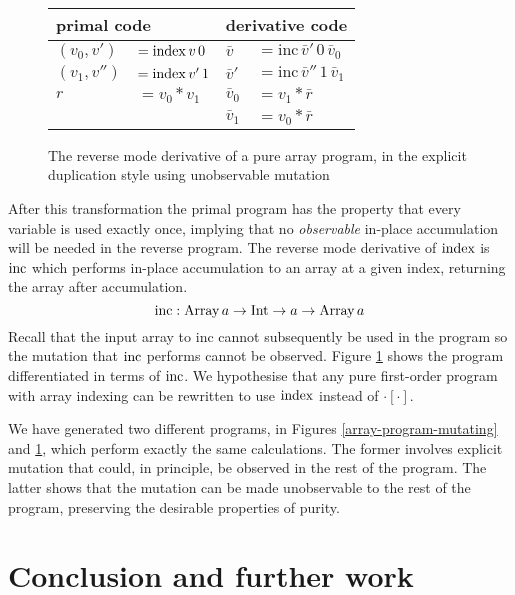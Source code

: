 \documentclass[12pt]{article}
\begin{document}
\begin{figure}[t]
\center
\begin{tabular}[t]{ll|ll}
  \multicolumn{2}{l|}{primal code}
  &
  \multicolumn{2}{l}{derivative code}
  \\

  \hline

  $(v_0, v')$ & $ = \mathrm{index} \, v \, 0$
  &
  $\bar{v}$ & $ = \mathrm{inc} \, \bar{v}' \, 0 \, \bar{v}_0$
  \\
  
  $(v_1, v'')$ & $ = \mathrm{index} \, v' \, 1$
  &
  $\bar{v}'$ & $ = \mathrm{inc} \, \bar{v}'' \, 1 \, \bar{v}_1$
  \\

  $r$ & $ = v_0 * v_1$
  &
  $\bar{v}_0$ & $ = v_1 * \bar{r}$
  \\

  & &
  $\bar{v}_1$ & $ = v_0 * \bar{r}$
  \\
\end{tabular}
\caption{\label{array-program-dup} The reverse mode derivative of
  a pure array program, in the explicit duplication style using
  unobservable mutation}
\end{figure}

After this transformation the primal program has the property that
every variable is used exactly once, implying that no
\emph{observable} in-place accumulation will be needed in the reverse
program.  The reverse mode derivative of $\mathrm{index}$ is $\mathrm{inc}$ which
performs in-place accumulation to an array at a given index, returning the array
after accumulation.
\[
\mathrm{inc} : \mathrm{Array} \, a \to \mathrm{Int} \to a \to \mathrm{Array}
\, a
\]
Recall that the input array to $\textrm{inc}$
cannot subsequently be used in the program so the mutation that
$\mathrm{inc}$ performs cannot be observed.  Figure \ref{array-program-dup}
shows the program differentiated in terms of $\mathrm{inc}$.
We hypothesise that any pure first-order program with array indexing
can be rewritten to use $\mathrm{index}$ instead of $\cdot[\cdot]$.

We have generated two different programs, in Figures
\ref{array-program-mutating} and \ref{array-program-dup}, which
perform exactly the same calculations.  The former involves explicit
mutation that could, in principle, be observed in the rest of the
program.  The latter shows that the mutation can be made unobservable
to the rest of the program, preserving the desirable properties of
purity.

\section{Conclusion and further work}
\end{document}
